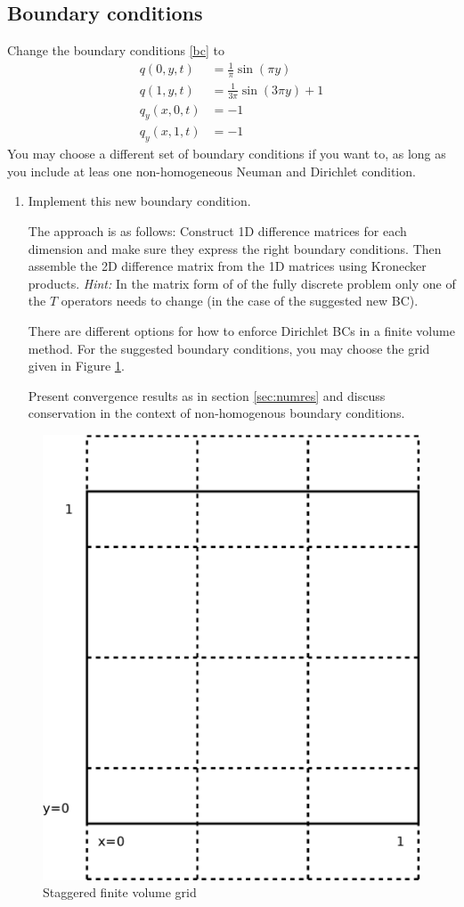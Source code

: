 \documentclass[11pt, a4paper]{article}
\begin{document}
\subsection{Boundary conditions} \label{sec:bc}
Change the boundary conditions \eqref{bc} to
\begin{align*}
  q(0,y,t) &= \frac{1}{\pi}\sin(\pi y)\\
  q(1,y,t) &= \frac{1}{3\pi}\sin(3 \pi y)+1\\
  q_y(x,0,t) &= -1\\
  q_y(x,1,t) &= -1
\end{align*}
You may choose a different set of boundary conditions if you want to,
as long as you include at leas one non-homogeneous Neuman and Dirichlet
condition. 
\begin{enumerate}
\item Implement this new boundary condition. 
 
  The approach is as follows: Construct 1D difference matrices for
  each dimension and make sure they express the right boundary
  conditions. Then assemble the 2D difference matrix from the 1D
  matrices using Kronecker products. \emph{Hint:} In the matrix form
  of of the fully discrete problem only one of the $T$ operators needs
  to change (in the case of the suggested new BC).

  There are different options for how to enforce Dirichlet BCs in a
  finite volume method. For the suggested boundary conditions, you may
  choose the grid given in Figure \ref{fig:grid_2}.

  Present convergence results as in section \ref{sec:numres} and
  discuss conservation in the context of non-homogenous boundary
  conditions.
\end{enumerate}
\begin{figure}
  \centering
  \includegraphics[scale=0.4]{fig/grid2}
  \caption{Staggered finite volume grid}
  \label{fig:grid_2}
\end{figure}
\end{document}
